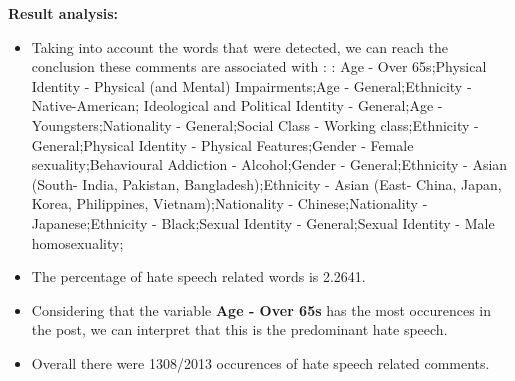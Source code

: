 \documentclass[11pt]{article}
\begin{document}
\textbf{\Large Result analysis:}

\begin{itemize}\item Taking into account the words that were detected, we can reach the conclusion these comments are associated with : : Age - Over 65s;Physical Identity - Physical (and Mental) Impairments;Age - General;Ethnicity - Native-American; Ideological and Political Identity - General;Age - Youngsters;Nationality - General;Social Class - Working class;Ethnicity - General;Physical Identity - Physical Features;Gender - Female sexuality;Behavioural Addiction - Alcohol;Gender - General;Ethnicity - Asian (South- India, Pakistan, Bangladesh);Ethnicity - Asian (East- China, Japan, Korea, Philippines, Vietnam);Nationality - Chinese;Nationality - Japanese;Ethnicity - Black;Sexual Identity - General;Sexual Identity - Male homosexuality;%

\item The percentage of hate speech related words is 2.2641.

\item Considering that the variable \textbf{Age - Over 65s} has the most occurences in the post, we can interpret that this is the predominant hate speech.

\item Overall there were 1308/2013 occurences of hate speech related comments.\end{itemize}
\end{document}

